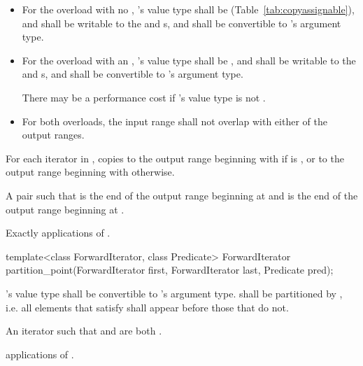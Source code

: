 \begin{itemdescr}
\pnum
\requires
\begin{itemize}
\item
For the overload with no , 's
value type shall be  (Table~\ref{tab:copyassignable}),
and shall be writable to the 
and  s, and shall be convertible to
's argument type.

\item
For the overload with an , 's
value type shall be , and shall be writable to the
 and  s, and shall be
convertible to 's argument type.
\begin{note}
There may be a performance cost if 's value type is not
.
\end{note}

\item
For both overloads, the input range shall not overlap with either of the output ranges.
\end{itemize}

\pnum
\effects For each iterator  in , copies  to the output range beginning with  if  is , or to the output range beginning with  otherwise.

\pnum
\returns A pair  such that  is the end of the output range beginning at  and  is the end of the output range beginning at .

\pnum
\complexity Exactly  applications of .
\end{itemdescr}

%
\begin{itemdecl}
template<class ForwardIterator, class Predicate>
  ForwardIterator partition_point(ForwardIterator first,
                                  ForwardIterator last,
                                  Predicate pred);
\end{itemdecl}


\begin{itemdescr}
\pnum
\requires {}'s value type shall be convertible to 's argument type.  shall be partitioned by , i.e. all elements that satisfy  shall appear before those that do not.

\pnum
\returns An iterator  such that  and  are both .

\pnum
\complexity {} applications of .
\end{itemdescr}

